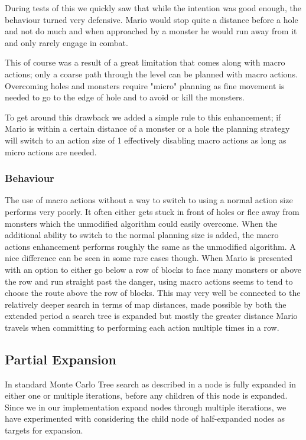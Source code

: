 \documentclass[10pt,a4paper]{article}
\begin{document}
During tests of this we quickly saw that while the intention was good enough, the behaviour turned very defensive. Mario would stop quite a distance before a hole and not do much and when approached by a monster he would run away from it and only rarely engage in combat.

This of course was a result of a great limitation that comes along with macro actions; only a coarse path through the level can be planned with macro actions. Overcoming holes and monsters require "micro" planning as fine movement is needed to go to the edge of hole and to avoid or kill the monsters.

To get around this drawback we added a simple rule to this enhancement; if Mario is within a certain distance of a monster or a hole the planning strategy will switch to an action size of 1 effectively disabling macro actions as long as micro actions are needed.

\subsubsection{Behaviour}
The use of macro actions without a way to switch to using a normal action size performs very poorly. It often either gets stuck in front of holes or flee away from monsters which the unmodified algorithm could easily overcome. 
When the additional ability to switch to the normal planning size is added, the macro actions enhancement performs roughly the same as the unmodified algorithm. 
A nice difference can be seen in some rare cases though. When Mario is presented with an option to either go below a row of blocks to face many monsters or above the row and run straight past the danger, using macro actions seems to tend to choose the route above the row of blocks. 
This may very well be connected to the relatively deeper search in terms of map distances, made possible by both the extended period a search tree is expanded but mostly the greater distance Mario travels when committing to performing each action multiple times in a row.


\subsection{Partial Expansion}
In standard Monte Carlo Tree search as described in %
a node is fully expanded in either one or multiple iterations, before any children of this node is expanded.
Since we in our implementation expand nodes through multiple iterations, we have experimented with considering the child node of half-expanded nodes as targets for expansion.
\end{document}
